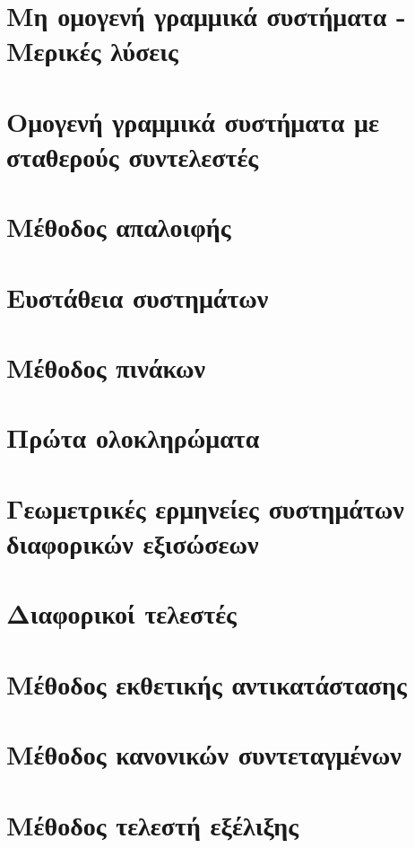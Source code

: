 \documentclass[11pt,a4paper,twoside]{book}
\begin{document}
\section{Μη ομογενή γραμμικά συστήματα - Μερικές λύσεις}
\section{Ομογενή γραμμικά συστήματα με σταθερούς συντελεστές}
\section{Μέθοδος απαλοιφής}
\section{Ευστάθεια συστημάτων}
\section{Μέθοδος πινάκων}
\section{Πρώτα ολοκληρώματα}
\section{Γεωμετρικές ερμηνείες συστημάτων διαφορικών εξισώσεων}
\section{Διαφορικοί τελεστές}
\section{Μέθοδος εκθετικής αντικατάστασης}
\section{Μέθοδος κανονικών συντεταγμένων}
\section{Μέθοδος τελεστή εξέλιξης}
\end{document}
